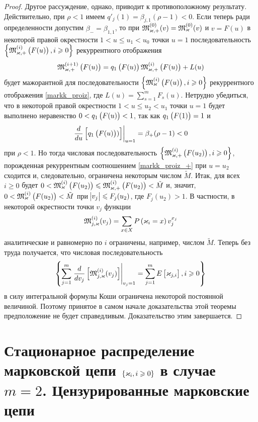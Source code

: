 \documentclass[a4paper,14pt,russian]{article}
\newcommand{\Markk}[0]{\brrr{ \vk_i, i \geqslant 0}}
\begin{document}
\begin{proof}
Другое рассуждение, однако, приводит к противоположному результату. Действительно, при $\rho < 1$ имеем $q'_j(1) = \beta_{j,1}(\rho - 1) < 0$. Если теперь ради определенности допустим $\beta_- = \beta_{1,1}$, то при $\mathfrak{M}_{\varkappa,+}^{(0)}(v) =\mathfrak{M}_{\varkappa}^{(0)}(v) $ и $v = F(u)$ в некоторой правой окрестности  $1 < u\leqslant u_1 < u_0$ точки $u=1$ последовательность $\left\{\mathfrak{M}_{\varkappa,+}^{(i)}\left(F(u)\right), i \geqslant 0\right\}$ рекуррентного отображения 
\begin{equation}
\mathfrak{M}_{\varkappa,+}^{(i+1)}\left(F(u)\right) = q_1\left(F(u)\right) \mathfrak{M}_{\varkappa,+}^{(i)}\left(F(u)\right) + L(u)
\label{markk_proiz_+}
\end{equation}
будет мажорантной для последовательности  $\left\{\mathfrak{M}_{\varkappa}^{(i)}\left(F(u)\right), i \geqslant 0\right\}$ рекуррентного отображения \eqref{markk_proiz}, где $L(u) = \sum_{s = 1}^m F_s (u)$. Нетрудно убедиться, что в некоторой правой окрестности $1 < u \leqslant u_2 < u_1$ точки  $u= 1$ будет выполнено неравенство $0 < q_1\left(F(u)\right) < 1$, так как $q_1\left(F(1)\right) = 1$ и 
$$
\left. \frac{d}{du}\left[q_1\left(F(u)\right))\right] \right|_{u=1} = \beta_+(\rho - 1)<0
$$
при $\rho < 1$. Но тогда числовая последовательность $\left\{\mathfrak{M}_{\varkappa,+}^{(i)}\left(F(u_2)\right), i \geqslant 0\right\}$, порожденная рекуррентным соотношением \eqref{markk_proiz_+} при $u = u_2$ сходится и, следовательно, 
ограничена некоторым числом $\tilde{M}$. Итак, для всех $i \geqslant 0$ будет $0 < \mathfrak{M}_{\varkappa}^{(i)}\left(F(u_2)\right) \leqslant \mathfrak{M}_{\varkappa, +}^{(i)}\left(F(u_2)\right)< \tilde{M}$ и, значит,  $0 < \mathfrak{M}_{\varkappa}^{(i)}\left(F(u_2)\right)< \tilde{M}$ при $\abs{v_j}\leqslant F_j(u_2)$, где $F_j(u_2)>1$. В частности, в некоторой окрестности точки $v_j$ функции 
$$
\mathfrak{M}_{j,\varkappa}^{(i)} (v_j) = \sum_{x \in X} P\left(\varkappa_i = x\right) v_j^{x_j}
$$
аналитические и равномерно по $i$ ограничены, например, числом $\tilde{M}$. Теперь без труда получается, что числовая последовательность 
$$
\left\{\sum_{j=1}^m \left.\frac{d}{d v_j}\left[\mathfrak{M}_{j,\varkappa}^{(i)} (v_j)\right]\right|_{v_j = 1} = \sum_{j=1}^m E\left[\varkappa_{j,i}\right], i \geqslant 0\right\} 
$$
в силу интегральной формулы Коши ограничена некоторой постоянной величиной. Поэтому принятое в самом начале доказательства этой теоремы предположение не будет справедливым. Доказательство этим завершается.
\end{proof}

\newpage

\section{Стационарное распределение марковской цепи $\Markk$ в случае $m=2$. Цензурированные марковские цепи}
\end{document}
